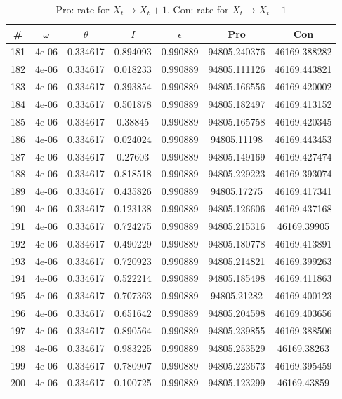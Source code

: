 \newpage
\begin{table}
\caption{Pro: rate for $X_t \rightarrow X_t + 1$, Con: rate for $X_t \rightarrow X_t - 1$}
\begin{tabular*}{\linewidth}{c|c|c|c|c|c|c}
\# & $\omega$ & $\theta$ & $I$ & $\epsilon$ & Pro & Con \\
\hline
181 & 4e-06 & 0.334617 & 0.894093 & 0.990889 & 94805.240376 & 46169.388282\\
182 & 4e-06 & 0.334617 & 0.018233 & 0.990889 & 94805.111126 & 46169.443821\\
183 & 4e-06 & 0.334617 & 0.393854 & 0.990889 & 94805.166556 & 46169.420002\\
184 & 4e-06 & 0.334617 & 0.501878 & 0.990889 & 94805.182497 & 46169.413152\\
185 & 4e-06 & 0.334617 & 0.38845 & 0.990889 & 94805.165758 & 46169.420345\\
186 & 4e-06 & 0.334617 & 0.024024 & 0.990889 & 94805.11198 & 46169.443453\\
187 & 4e-06 & 0.334617 & 0.27603 & 0.990889 & 94805.149169 & 46169.427474\\
188 & 4e-06 & 0.334617 & 0.818518 & 0.990889 & 94805.229223 & 46169.393074\\
189 & 4e-06 & 0.334617 & 0.435826 & 0.990889 & 94805.17275 & 46169.417341\\
190 & 4e-06 & 0.334617 & 0.123138 & 0.990889 & 94805.126606 & 46169.437168\\
191 & 4e-06 & 0.334617 & 0.724275 & 0.990889 & 94805.215316 & 46169.39905\\
192 & 4e-06 & 0.334617 & 0.490229 & 0.990889 & 94805.180778 & 46169.413891\\
193 & 4e-06 & 0.334617 & 0.720923 & 0.990889 & 94805.214821 & 46169.399263\\
194 & 4e-06 & 0.334617 & 0.522214 & 0.990889 & 94805.185498 & 46169.411863\\
195 & 4e-06 & 0.334617 & 0.707363 & 0.990889 & 94805.21282 & 46169.400123\\
196 & 4e-06 & 0.334617 & 0.651642 & 0.990889 & 94805.204598 & 46169.403656\\
197 & 4e-06 & 0.334617 & 0.890564 & 0.990889 & 94805.239855 & 46169.388506\\
198 & 4e-06 & 0.334617 & 0.983225 & 0.990889 & 94805.253529 & 46169.38263\\
199 & 4e-06 & 0.334617 & 0.780907 & 0.990889 & 94805.223673 & 46169.395459\\
200 & 4e-06 & 0.334617 & 0.100725 & 0.990889 & 94805.123299 & 46169.43859\\

\end{tabular*}
\end{table}
